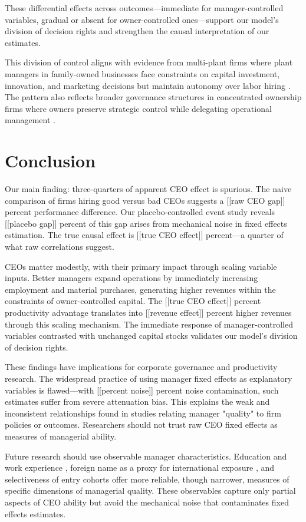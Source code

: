 \documentclass[11pt,a4paper]{article}
\begin{document}
These differential effects across outcomes—immediate for manager-controlled variables, gradual or absent for owner-controlled ones—support our model's division of decision rights and strengthen the causal interpretation of our estimates.

This division of control aligns with evidence from multi-plant firms where plant managers in family-owned businesses face constraints on capital investment, innovation, and marketing decisions but maintain autonomy over labor hiring \citep{bloom2012americans}. The pattern also reflects broader governance structures in concentrated ownership firms where owners preserve strategic control while delegating operational management \citep{zellweger2012managing}.

\section{Conclusion}

Our main finding: three-quarters of apparent CEO effect is spurious. The naive comparison of firms hiring good versus bad CEOs suggests a [[raw CEO gap]] percent performance difference. Our placebo-controlled event study reveals [[placebo gap]] percent of this gap arises from mechanical noise in fixed effects estimation. The true causal effect is [[true CEO effect]] percent—a quarter of what raw correlations suggest.

CEOs matter modestly, with their primary impact through scaling variable inputs. Better managers expand operations by immediately increasing employment and material purchases, generating higher revenues within the constraints of owner-controlled capital. The [[true CEO effect]] percent productivity advantage translates into [[revenue effect]] percent higher revenues through this scaling mechanism. The immediate response of manager-controlled variables contrasted with unchanged capital stocks validates our model's division of decision rights.

These findings have implications for corporate governance and productivity research. The widespread practice of using manager fixed effects as explanatory variables is flawed—with [[percent noise]] percent noise contamination, such estimates suffer from severe attenuation bias. This explains the weak and inconsistent relationships found in studies relating manager "quality" to firm policies or outcomes. Researchers should not trust raw CEO fixed effects as measures of managerial ability.

Future research should use observable manager characteristics. Education and work experience \citep{DePirro2025}, foreign name as a proxy for international exposure \citep{Koren2023expat}, and selectiveness of entry cohorts \citep{koren2024managers} offer more reliable, though narrower, measures of specific dimensions of managerial quality. These observables capture only partial aspects of CEO ability but avoid the mechanical noise that contaminates fixed effects estimates.
\end{document}

